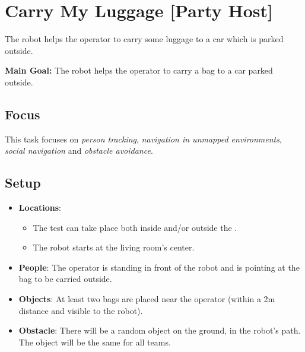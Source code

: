 \section{Carry My Luggage [Party Host]}
\label{test:carry-my-luggage}


The robot helps the operator to carry some luggage to a car which is parked outside.

\noindent \textbf{Main Goal:} The robot helps the operator to carry a bag to a car parked outside.\\


\subsection*{Focus}
This task focuses on \textit{person tracking}, \emph{navigation in unmapped environments}, \emph{social navigation} and \textit{obstacle avoidance}.

\subsection*{Setup}
\begin{itemize}[nosep]
	\item \textbf{Locations}: 
		\begin{itemize}
		 \item The test can take place both inside and/or outside the \Arena{}.
		 \item The robot starts at the living room's center.
		\end{itemize}
	\item \textbf{People}: The operator is standing in front of the robot and is pointing at the bag to be carried outside.
	\item \textbf{Objects}: At least two bags are placed near the operator (within a 2m distance and visible to the robot).
	\item \textbf{Obstacle}: There will be a random object on the ground, in the robot's path. The object will be the same for all teams.
\end{itemize}

